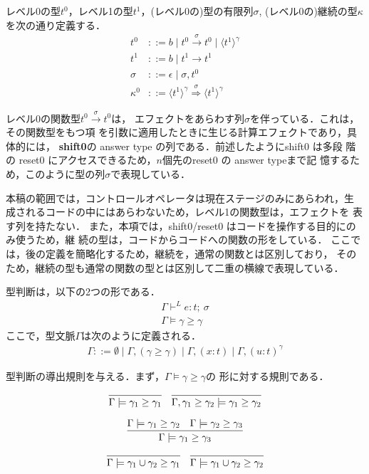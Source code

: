 \documentclass[T]{compsoft}
\newcommand\Shiftz{\textbf{shift0}}
\newcommand\codeT[2]{\langle{#1}\rangle^{#2}}
\newcommand\funT[3]{{#1} \stackrel{#3}{\rightarrow} {#2}}
\newcommand\contT[3]{{#1} \stackrel{#3}{\Rightarrow} {#2}}
\newcommand\ord{\ge}
\theoremstyle{break}
\begin{document}
レベル0の型$t^0$，レベル1の型$t^1$，(レベル0の)型の有限列$\sigma$,
(レベル0の)継続の型$\kappa$を次の通り定義する．
\begin{align*}
  t^0 & ::= b \mid \funT{t^0}{t^0}{\sigma} \mid \codeT{t^1}{\gamma} \\
  t^1 & ::= b \mid t^1 \to t^1 \\
  \sigma & ::= \epsilon \mid \sigma,t^0 \\
  \kappa^0 & ::= \contT{\codeT{t^1}{\gamma}}{\codeT{t^1}{\gamma}}{\sigma}
\end{align*}

レベル0の関数型$\funT{t^0}{t^0}{\sigma}$は，
エフェクトをあらわす列$\sigma$を伴っている．これは，その関数型をもつ項
を引数に適用したときに生じる計算エフェクトであり，具体的には，
\Shiftz の answer type の列である．前述したようにshift0 は多段
階の reset0 にアクセスできるため，$n$個先のreset0 の answer typeまで記
憶するため，このように型の列$\sigma$で表現している．

本稿の範囲では，コントロールオペレータは現在ステージのみにあらわれ，生
成されるコードの中にはあらわないため，レベル1の関数型は，エフェクトを
表す列を持たない．
また，本項では，shift0/reset0 はコードを操作する目的にのみ使うため，継
続の型は，コードからコードへの関数の形をしている．
ここでは，後の定義を簡略化するため，継続を，通常の関数とは区別しており，
そのため，継続の型も通常の関数の型とは区別して二重の横線で表現している．

型判断は，以下の2つの形である．
\begin{align*}
  \Gamma \vdash^{L} e : t ;~\sigma \\
  \Gamma \models \gamma \ord \gamma
\end{align*}
ここで，型文脈$\Gamma$は次のように定義される．
\begin{align*}
  \Gamma ::= \emptyset
  \mid \Gamma, (\gamma \ord \gamma)
  \mid \Gamma, (x : t)
  \mid \Gamma, (u : t)^{\gamma}
\end{align*}

型判断の導出規則を与える．まず，$\Gamma \models \gamma \ord \gamma$の
形に対する規則である．

\[
  \infer
  {\Gamma \models \gamma_1 \ord \gamma_1}
  {}
  \quad
  \infer
  {\Gamma, \gamma_1 \ord \gamma_2 \models \gamma_1 \ord \gamma_2}
  {}
\]

\[
  \infer
  {\Gamma \models \gamma_1 \ord \gamma_3}
  {\Gamma \models \gamma_1 \ord \gamma_2 & \Gamma \models \gamma_2 \ord \gamma_3}
\]

\[
  \infer
  {\Gamma \models \gamma_1 \cup \gamma_2 \ord \gamma_1}
  {}
  \quad
  \infer
  {\Gamma \models \gamma_1 \cup \gamma_2 \ord \gamma_2}
  {}
\]
\end{document}
